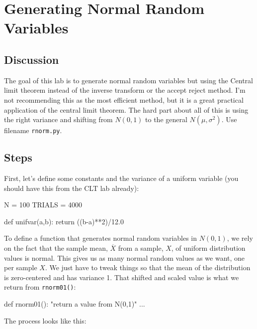 \chapter{Generating Normal Random Variables}

\setcounter{problem}{1}
\section{Discussion}

\begin{fullwidth}


The goal of this lab is to generate normal random variables but using the Central limit theorem instead of the inverse transform or the accept reject method. I'm not recommending this as the most efficient method, but it is a great practical application of the central limit theorem.  The hard part about all of this is using the right variance and shifting from $N(0,1)$ to the general $N(\mu, \sigma^2)$. Use filename {\tt rnorm.py}.

\section{Steps}

\step First, let's define some constants and the variance of a uniform variable (you should have this from the CLT lab already):

\begin{pyverbatim}
N = 100
TRIALS = 4000

def unifvar(a,b):
	return ((b-a)**2)/12.0
\end{pyverbatim}

\step To define a function that generates normal random variables in $N(0,1)$, we rely on the fact that the sample mean, $\overline X$ from a sample, $X$, of uniform distribution values is normal.  This gives us as many normal random values as we want, one per sample $X$. We just have to tweak things so that the mean of the distribution is zero-centered and has variance 1. That shifted and scaled value is what we return from {\tt rnorm01()}:

\begin{pyverbatim}
def rnorm01():
    "return a value from N(0,1)"
    ...
\end{pyverbatim}	

\noindent The process looks like this:

\renewcommand{\theenumi}{\Alph{enumi}}


\end{fullwidth}
